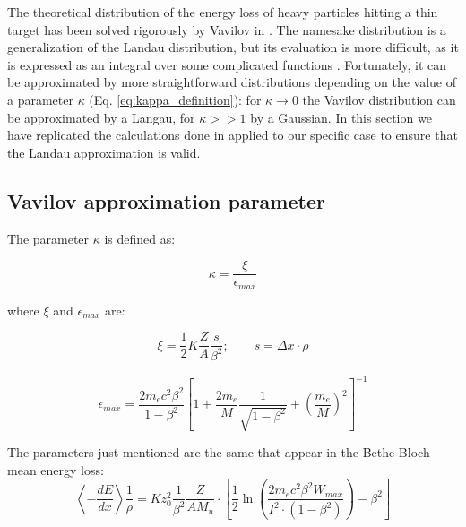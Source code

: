 
The theoretical distribution of the energy loss of heavy particles hitting a thin target has been solved rigorously by Vavilov in \cite{vavilov_1957}. The namesake distribution is a generalization of the Landau distribution, but its evaluation is more difficult, as it is expressed as an integral over some complicated functions \cite[Eq.(4)]{vavilov_1957}. Fortunately, it can be approximated by more straightforward distributions depending on the value of a parameter $\kappa$ (Eq. \eqref{eq:kappa_definition}): for $\kappa\rightarrow0$ the Vavilov distribution can be approximated by a Langau, for $\kappa>>1$ by a Gaussian. 
In this section we have replicated the calculations done in \cite{NAP20066} applied to our specific case to ensure that the Landau approximation is valid. 

\subsection{Vavilov approximation parameter} %

The parameter \(\kappa\) is defined as:

\begin{equation}\label{eq:kappa_definition}
    \kappa = \frac{\xi}{\epsilon_{max}}
\end{equation}

where $\xi$ and $\epsilon_{max}$ \cite[Eq.(1)]{NAP20066} are:

\begin{equation*}
    \xi = \frac{1}{2} K \frac{Z}{A} \frac{s} {\beta^2}; \qquad s = \Delta x \cdot \rho
\end{equation*}

\begin{equation*}
\epsilon_{max} = \frac{2m_e c^2 \beta^2}{1-\beta^2}\left[ 1 + \frac{2m_e}{M}\frac{1}{\sqrt{1-\beta^2}} + \left(\frac{m_e}{M}\right)^2 \right]^{-1}
\end{equation*}


The parameters just mentioned are the same that appear in the Bethe-Bloch mean energy loss:
\begin{equation*}
    \left\langle-\frac{dE}{dx} \right\rangle \frac{1}{\rho} =  K z_0^2 \frac{1}{\beta^2} \frac{Z}{A M_u} \cdot\left[\frac{1}{2}\ln \left(\frac{2m_e c^2 \beta^2 W_{max}}{I^2 \cdot (1-\beta^2)}\right) - \beta^2\right]
\end{equation*}

